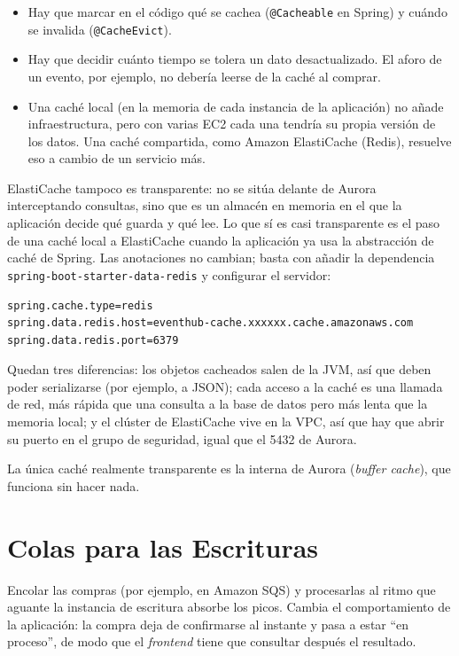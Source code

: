 \documentclass[12pt,a4paper]{article}
\begin{document}
\begin{itemize}
    \item Hay que marcar en el código qué se cachea (\texttt{@Cacheable} en Spring) y cuándo se invalida (\texttt{@CacheEvict}).
    \item Hay que decidir cuánto tiempo se tolera un dato desactualizado. El aforo de un evento, por ejemplo, no debería leerse de la caché al comprar.
    \item Una caché local (en la memoria de cada instancia de la aplicación) no añade infraestructura, pero con varias EC2 cada una tendría su propia versión de los datos. Una caché compartida, como Amazon ElastiCache (Redis), resuelve eso a cambio de un servicio más.
\end{itemize}

ElastiCache tampoco es transparente: no se sitúa delante de Aurora interceptando consultas, sino que es un almacén en memoria en el que la aplicación decide qué guarda y qué lee. Lo que sí es casi transparente es el paso de una caché local a ElastiCache cuando la aplicación ya usa la abstracción de caché de Spring. Las anotaciones no cambian; basta con añadir la dependencia \texttt{spring-boot-starter-data-redis} y configurar el servidor:

\begin{lstlisting}[language=properties,basicstyle=\ttfamily\footnotesize]
spring.cache.type=redis
spring.data.redis.host=eventhub-cache.xxxxxx.cache.amazonaws.com
spring.data.redis.port=6379
\end{lstlisting}

\vspace{1em}

Quedan tres diferencias: los objetos cacheados salen de la JVM, así que deben poder serializarse (por ejemplo, a JSON); cada acceso a la caché es una llamada de red, más rápida que una consulta a la base de datos pero más lenta que la memoria local; y el clúster de ElastiCache vive en la VPC, así que hay que abrir su puerto en el grupo de seguridad, igual que el 5432 de Aurora.

La única caché realmente transparente es la interna de Aurora (\textit{buffer cache}), que funciona sin hacer nada.

\section{Colas para las Escrituras}

Encolar las compras (por ejemplo, en Amazon SQS) y procesarlas al ritmo que aguante la instancia de escritura absorbe los picos. Cambia el comportamiento de la aplicación: la compra deja de confirmarse al instante y pasa a estar ``en proceso'', de modo que el \textit{frontend} tiene que consultar después el resultado.
\end{document}
